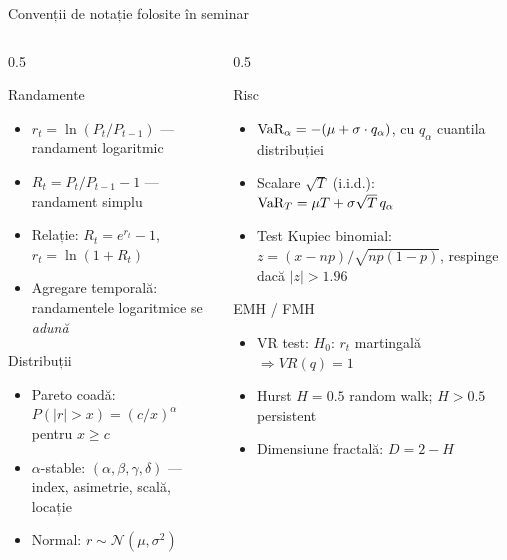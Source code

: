 \documentclass[9pt, aspectratio=169, t]{beamer}
\begin{document}
\begin{frame}{Convenții de notație folosite în seminar}
\begin{columns}[T]
\begin{column}{0.5\textwidth}
\begin{block}{Randamente}
\begin{itemize}\setlength{\itemsep}{1pt}
    \item $r_t = \ln(P_t/P_{t-1})$ --- randament logaritmic
    \item $R_t = P_t/P_{t-1}-1$ --- randament simplu
    \item Relație: $R_t = e^{r_t}-1$, $r_t = \ln(1+R_t)$
    \item Agregare temporală: randamentele logaritmice se \emph{adună}
\end{itemize}
\end{block}
\begin{block}{Distribuții}
\begin{itemize}\setlength{\itemsep}{1pt}
    \item Pareto coadă: $P(|r|>x)=(c/x)^\alpha$ pentru $x\geq c$
    \item $\alpha$-stable: $(\alpha,\beta,\gamma,\delta)$ --- index, asimetrie, scală, locație
    \item Normal: $r\sim\mathcal N(\mu,\sigma^2)$
\end{itemize}
\end{block}
\end{column}
\begin{column}{0.5\textwidth}
\begin{block}{Risc}
\begin{itemize}\setlength{\itemsep}{1pt}
    \item $\text{VaR}_\alpha = -(\mu+ \sigma\cdot q_\alpha)$, cu $q_\alpha$ cuantila distribuției
    \item Scalare $\sqrt{T}$ (i.i.d.): $\text{VaR}_T = \mu T + \sigma\sqrt{T}\,q_\alpha$
    \item Test Kupiec binomial: $z=(x-np)/\sqrt{np(1-p)}$, respinge dacă $|z|>1.96$
\end{itemize}
\end{block}
\begin{block}{EMH / FMH}
\begin{itemize}\setlength{\itemsep}{1pt}
    \item VR test: $H_0$: $r_t$ martingală $\Rightarrow VR(q)=1$
    \item Hurst $H=0.5$ random walk; $H>0.5$ persistent
    \item Dimensiune fractală: $D = 2 - H$
\end{itemize}
\end{block}
\end{column}
\end{columns}
\end{frame}
\end{document}
